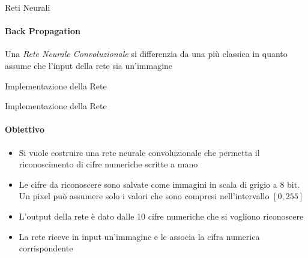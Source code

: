 \documentclass[
 ]{beamer}
\begin{document}

\begin{frame}{Reti Neurali}
    \framesubtitle{Back Propagation}  
    Una \emph{Rete Neurale Convoluzionale} si differenzia da una più classica in quanto assume che l'input della rete sia un'immagine
\end{frame}



   

\begin{frame}[c]
  \centering
  \bigskip \bigskip    
  \Huge Implementazione della Rete
\end{frame}

\begin{frame}{Implementazione della Rete}
    \framesubtitle{Obiettivo}
    \begin{itemize} [<+->]
        \setlength\itemsep{2em}
        \item \large Si vuole costruire una rete neurale convoluzionale che permetta il riconoscimento di cifre numeriche scritte a mano
        \item \large Le cifre da riconoscere sono salvate come immagini in scala di grigio a 8 bit. Un pixel può assumere solo i valori che sono compresi nell'intervallo $[0,255]$
        \item \large L'output della rete è dato dalle 10 cifre numeriche che si vogliono riconoscere
        \item \large La rete riceve in input un'immagine e le associa la cifra numerica corrispondente
    \end{itemize}
\end{frame}
\end{document}
